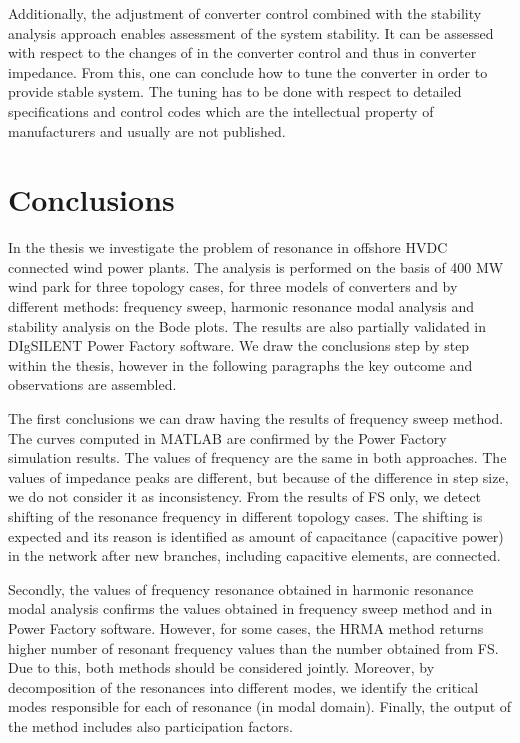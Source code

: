 \documentclass[a4paper,11pt,twoside]{report} %
\begin{document}
Additionally, the adjustment of converter control combined with the stability analysis approach enables assessment of the system stability. It can be assessed with respect to the changes of in the converter control and thus in converter impedance. From this, one can conclude how to tune the converter in order to provide stable system. The tuning has to be done with respect to detailed specifications and control codes which are the intellectual property of manufacturers and usually are not published.

\chapter{Conclusions}

In the thesis we investigate the problem of resonance in offshore HVDC connected wind power plants. The analysis is performed on the basis of 400 MW wind park for three topology cases, for three models of converters and by different methods: frequency sweep, harmonic resonance modal analysis and stability analysis on the Bode plots. The results are also partially validated in DIgSILENT Power Factory software. We draw the conclusions step by step within the thesis, however in the following paragraphs the key outcome and observations are assembled.

The first conclusions we can draw having the results of frequency sweep method. The curves computed in MATLAB are confirmed by the Power Factory simulation results. The values of frequency are the same in both approaches. The values of impedance peaks are different, but because of the difference in step size, we do not consider it as inconsistency. From the results of FS only, we detect shifting of the resonance frequency in different topology cases. The shifting is expected and its reason is identified as amount of capacitance (capacitive power) in the network after new branches, including capacitive elements, are connected.

Secondly, the values of frequency resonance obtained in harmonic resonance modal analysis confirms the values obtained in frequency sweep method and in Power Factory software. However, for some cases, the HRMA method returns higher number of resonant frequency values than the number obtained from FS. Due to this, both methods should be considered jointly. Moreover, by decomposition of the resonances into different modes, we identify the critical modes responsible for each of resonance (in modal domain). Finally, the output of the method includes also participation factors.
\end{document}
